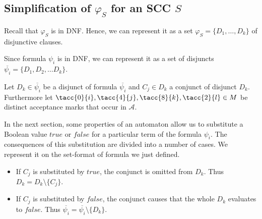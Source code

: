 \documentclass[a4paper,UKenglish,cleveref, autoref, thm-restate]{lipics-v2021}
\def\false{\mathit{false}}
\def\true{\mathit{true}}
\begin{document}

\subsection{Simplification of $\varphi_S$ for an SCC $S$}\label{ssec:step1}
Recall that $\varphi_S$ is in DNF. Hence, we can represent it as a set
$\varphi_S=\{D_1,\ldots,D_k\}$ of disjunctive clauses.





Since formula $\psi_{i}$ is in DNF, we can represent it as a set of disjuncts $\overline{\psi_{i}} = \{D_1, D_2, \ldots D_k\}$.

Let $D_{k} \in \overline{\psi_{i}}$ be a disjunct of formula $\overline{\psi_{i}}$ and $C_{j} \in D_{k}$ a conjunct of disjunct $D_{k}$. Furthermore let  $\tacc{0}{i}, \tacc{4}{j}, \tacc{8}{k}, \tacc{2}{l} \in M$ be distinct acceptance marks that occur in $\mathcal{A}$.

In the next section, some properties of an automaton allow us to substitute a Boolean value $\true$ or $\false$ for a particular term of the formula $\psi_i$.
The consequences of this substitution are divided into a number of cases. We represent it on the set-format of formula we just defined.

\begin{itemize}
    \item If $C_{j}$ is substituted by $\true$, the conjunct is omitted from $D_{k}$. Thus $D_{k} = D_{k} \setminus \{C_{j}\}$.
    \item If $C_{j}$ is substituted by $\false$, the conjunct causes that the whole $D_{k}$ evaluates to $\false$. Thus $\overline{\psi_{i}} = \overline{\psi_{i}} \setminus \{D_{k}\}$.

\end{itemize}
\end{document}
